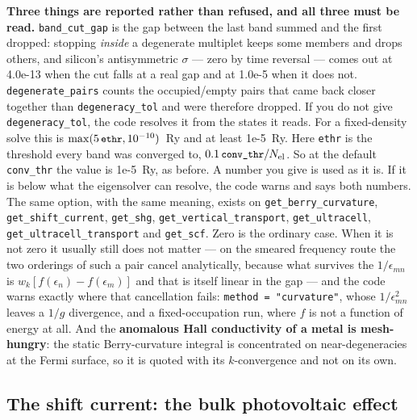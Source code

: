 \documentclass[11pt,a4paper]{article}
\newcommand{\code}[1]{\texttt{\small #1}}
\begin{document}
\begin{refuses}
\textbf{Three things are reported rather than refused, and all three must be
read.} \code{band\_cut\_gap} is the gap between the last band summed and the
first dropped: stopping \emph{inside} a degenerate multiplet keeps some members
and drops others, and silicon's antisymmetric $\sigma$ --- zero by time
reversal --- comes out at 4.0e-13 when the cut falls at a real gap and at
1.0e-5 when it does not. \code{degenerate\_pairs} counts the occupied/empty
pairs that came back closer together than \code{degeneracy\_tol} and were
therefore dropped. If you do not give \code{degeneracy\_tol}, the code resolves
it from the states it reads. For a fixed-density solve this is
$\max(5\,\code{ethr}, 10^{-10})$~Ry and at least 1e-5~Ry. Here \code{ethr} is
the threshold every band was converged to, $0.1\,\code{conv\_thr}/N_{\rm el}$.
So at the default \code{conv\_thr} the value is 1e-5~Ry, as before. A number
you give is used as it is. If it is below what the eigensolver can resolve, the
code warns and says both numbers. The same option, with the same meaning, exists
on \code{get\_berry\_curvature}, \code{get\_shift\_current}, \code{get\_shg},
\code{get\_vertical\_transport}, \code{get\_ultracell},
\code{get\_ultracell\_transport} and \code{get\_scf}.
Zero is the ordinary case. When it is not zero it usually still does not
matter --- on the smeared frequency route the two orderings of such a pair
cancel analytically, because what survives the $1/\epsilon_{mn}$ is
$w_k[f(\epsilon_n)-f(\epsilon_m)]$ and that is itself linear in the gap ---
and the code warns exactly where that cancellation fails: \code{method =
"curvature"}, whose $1/\epsilon_{mn}^2$ leaves a $1/g$ divergence, and a
fixed-occupation run, where $f$ is not a function of energy at all. And the
\textbf{anomalous Hall conductivity of a metal is mesh-hungry}: the static
Berry-curvature integral is concentrated on near-degeneracies at the Fermi
surface, so it is quoted with its $k$-convergence and not on its own.
\end{refuses}

\subsection{The shift current: the bulk photovoltaic effect}
\end{document}

